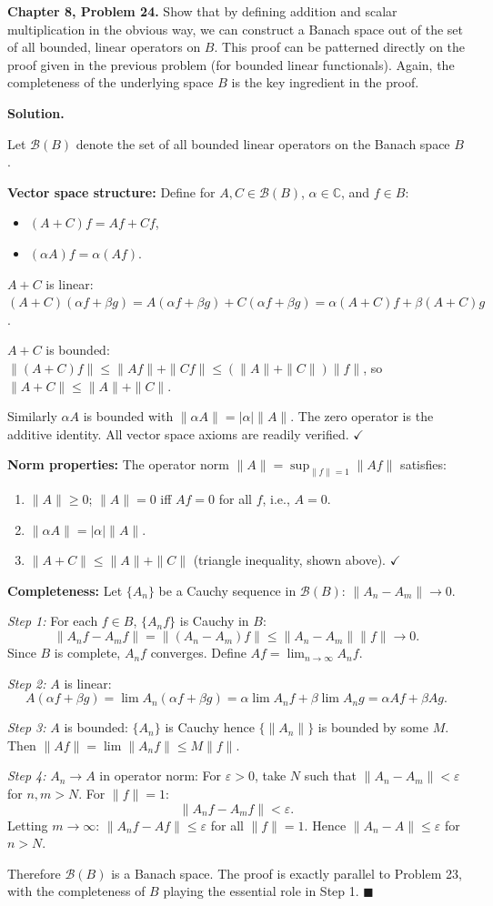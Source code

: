 \documentclass[12pt]{article}
\begin{document}
\textbf{Chapter 8, Problem 24.} Show that by defining addition and scalar multiplication in the obvious way, we can construct a Banach space out of the set of all bounded, linear operators on $B$. This proof can be patterned directly on the proof given in the previous problem (for bounded linear functionals). Again, the completeness of the underlying space $B$ is the key ingredient in the proof.

\bigskip
\textbf{Solution.}

Let $\mathcal{B}(B)$ denote the set of all bounded linear operators on the Banach space $B$.

\textbf{Vector space structure:}
Define for $A,C\in\mathcal{B}(B)$, $\alpha\in\mathbb{C}$, and $f\in B$:
\begin{itemize}
\item $(A+C)f = Af+Cf$,
\item $(\alpha A)f = \alpha(Af)$.
\end{itemize}

$A+C$ is linear: $(A+C)(\alpha f+\beta g) = A(\alpha f+\beta g)+C(\alpha f+\beta g) = \alpha(A+C)f+\beta(A+C)g$.

$A+C$ is bounded: $\|(A+C)f\|\le\|Af\|+\|Cf\|\le(\|A\|+\|C\|)\|f\|$, so $\|A+C\|\le\|A\|+\|C\|$.

Similarly $\alpha A$ is bounded with $\|\alpha A\| = |\alpha|\|A\|$. The zero operator is the additive identity. All vector space axioms are readily verified. $\checkmark$

\textbf{Norm properties:}
The operator norm $\|A\| = \sup_{\|f\|=1}\|Af\|$ satisfies:
\begin{enumerate}
\item $\|A\|\ge 0$; $\|A\|=0$ iff $Af=0$ for all $f$, i.e., $A=0$.
\item $\|\alpha A\| = |\alpha|\|A\|$.
\item $\|A+C\|\le\|A\|+\|C\|$ (triangle inequality, shown above). $\checkmark$
\end{enumerate}

\textbf{Completeness:}
Let $\{A_n\}$ be a Cauchy sequence in $\mathcal{B}(B)$: $\|A_n-A_m\|\to 0$.

\emph{Step 1:} For each $f\in B$, $\{A_nf\}$ is Cauchy in $B$:
\[
\|A_nf-A_mf\| = \|(A_n-A_m)f\|\le\|A_n-A_m\|\|f\|\to 0.
\]
Since $B$ is complete, $A_nf$ converges. Define $Af = \lim_{n\to\infty}A_nf$.

\emph{Step 2:} $A$ is linear:
\[
A(\alpha f+\beta g) = \lim A_n(\alpha f+\beta g) = \alpha\lim A_nf+\beta\lim A_ng = \alpha Af+\beta Ag.
\]

\emph{Step 3:} $A$ is bounded: $\{A_n\}$ is Cauchy hence $\{\|A_n\|\}$ is bounded by some $M$. Then $\|Af\| = \lim\|A_nf\|\le M\|f\|$.

\emph{Step 4:} $A_n\to A$ in operator norm: For $\varepsilon>0$, take $N$ such that $\|A_n-A_m\|<\varepsilon$ for $n,m>N$. For $\|f\|=1$:
\[
\|A_nf-A_mf\|<\varepsilon.
\]
Letting $m\to\infty$: $\|A_nf-Af\|\le\varepsilon$ for all $\|f\|=1$. Hence $\|A_n-A\|\le\varepsilon$ for $n>N$.

Therefore $\mathcal{B}(B)$ is a Banach space. The proof is exactly parallel to Problem 23, with the completeness of $B$ playing the essential role in Step 1. $\blacksquare$
\end{document}
